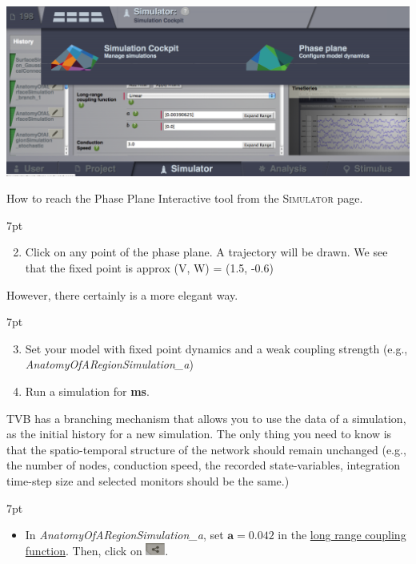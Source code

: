\documentclass{tufte-handout}
\newenvironment{simulation}{%
  \def\FrameCommand{%
    \hspace{1pt}%
    {\color{ForestGreen}\vrule width 2pt}%
    {\color{simulationshade}\vrule width 4pt}%
    \colorbox{simulationshade}%
  }%
  \MakeFramed{\advance\hsize-\width\FrameRestore}%
  \noindent\hspace{-4.55pt}%
  \begin{adjustwidth}{}{7pt}%
  \vspace{2pt}\vspace{2pt}%
}
{%
  \vspace{2pt}\end{adjustwidth}\endMakeFramed%
}
\begin{document}
\begin{marginfigure}%
  \includegraphics[width=\linewidth]{Handout_UI_BrainNetworkModelsAtRest_ToPhasePlane_b}%
  \caption{How to reach the Phase Plane Interactive tool from the \textsc{Simulator} page.}%
  \label{fig:to_phase_plane_b}%
\end{marginfigure}%

\begin{simulation}
\begin{enumerate}[resume]
  \setcounter{enumi}{1}
\item  Click on any point of the phase plane. A trajectory will be drawn.
We see that the fixed point is approx (V, W) = (1.5, -0.6)
\end{enumerate}
\end{simulation}

However, there certainly is a more elegant way. 

\begin{simulation}
\begin{enumerate}[resume]
 \setcounter{enumi}{2}
\item Set your model with fixed point dynamics and a weak coupling strength (e.g., \textit{AnatomyOfARegionSimulation\_a})
\item Run a simulation for \textbf{\unit[1000]{ms}}.
\end{enumerate}
\end{simulation}

TVB has a branching mechanism that allows you to use the data of a simulation, as the initial history for a new simulation. The only thing you
need to know is that the spatio-temporal structure of the network should
remain unchanged (e.g., the number of nodes, conduction speed, the recorded state-variables, integration time-step size and selected monitors should be the same.)

\begin{simulation}
\begin{itemize}[resume]
 \setcounter{enumi}{4}
 \item In \textit{AnatomyOfARegionSimulation\_a}, set $\mathbf{a=0.042}$ in the \underline{long range coupling function}. Then, click on \includegraphics[width=0.05\textwidth]{butt_branching.png}. 
\end{itemize}
\end{simulation}
\end{document}
